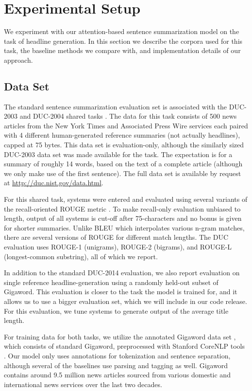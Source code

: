 \documentclass[11pt,a4paper]{article}
\begin{document}
 
\section{Experimental Setup}
\label{sec:methods}

We experiment with our attention-based sentence summarization model on the task
of headline generation. In this section we describe the
corpora used for this task, the baseline methods we compare with, and
implementation details of our approach.


\subsection{Data Set}

The standard sentence summarization evaluation set is associated with
the DUC-2003 and DUC-2004 shared tasks \cite{over2007duc}. The data
for this task consists of 500 news articles from the New York Times
and Associated Press Wire services each paired with 4 different
human-generated reference summaries (not actually headlines), capped at 75 bytes. This data set
is evaluation-only, although the similarly sized DUC-2003 data
set was made available for the task. The expectation is for a
summary of roughly 14 words, based on the text of a complete article (although we
only make use of the first sentence).  The full data set is available
by request at \url{http://duc.nist.gov/data.html}.

For this shared task, systems were entered and evaluated using
several variants of the recall-oriented ROUGE metric \cite{lin2004rouge}. To make
recall-only evaluation unbiased to length, output of all systems is
cut-off after 75-characters and no bonus is given for shorter
summaries. Unlike BLEU which interpolates various n-gram matches,
there are several versions of ROUGE for different match lengths. The
DUC evaluation uses ROUGE-1 (unigrams), ROUGE-2 (bigrams), and ROUGE-L
(longest-common substring), all of which we report.

In addition to the standard DUC-2014 evaluation, we also report
evaluation on single reference headline-generation using a randomly
held-out subset of Gigaword.  This evaluation is closer to the task
the model is trained for, and it allows us to use a bigger evaluation
set, which we will include in our code release. For this evaluation,
we tune systems to generate output of the average title length.

For training data for both tasks, we utilize the annotated Gigaword data set
\cite{graff2003english,napoles2012annotated}, which consists of
standard Gigaword, preprocessed with Stanford CoreNLP tools
\cite{manning2014stanford}. Our model only uses annotations for
tokenization and sentence separation, although several of the
baselines use parsing and tagging as well. Gigaword contains around
9.5 million news articles sourced from various domestic and
international news services over the last two decades.
\end{document}
